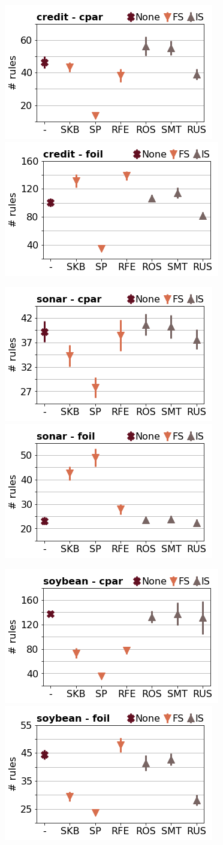 \documentclass[runningheads,a4paper]{llncs}
\begin{document}
\begin{figure}[!h]
\includegraphics[width=0.32\linewidth]{fig/preps_credit_RB_cpar_nbr_rules.png}
\includegraphics[width=0.32\linewidth]{fig/preps_credit_RB_foil_nbr_rules.png}
\end{figure}


\begin{figure}[!h]
\includegraphics[width=0.32\linewidth]{fig/preps_sonar_RB_cpar_nbr_rules.png}
\includegraphics[width=0.32\linewidth]{fig/preps_sonar_RB_foil_nbr_rules.png}
\end{figure}


\begin{figure}[!h]
\includegraphics[width=0.32\linewidth]{fig/preps_soybean_RB_cpar_nbr_rules.png}
\includegraphics[width=0.32\linewidth]{fig/preps_soybean_RB_foil_nbr_rules.png}
\end{figure}
\end{document}

